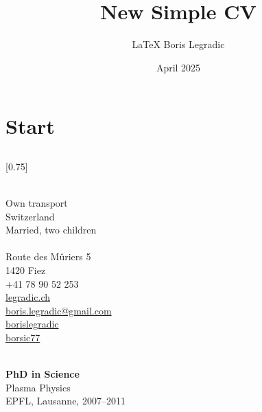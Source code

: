\documentclass[verylight]{simplehipstercv}
\title{New Simple CV}
\author{\LaTeX{} Boris Legradic}
\date{April 2025}
\begin{document}
\thispagestyle{empty}

\section*{Start}

\subsection*{}
\vspace{4em}

\setlength{\columnsep}{1.5cm}
[0.75]
\begin{paracol}{2}
\paracolbackgroundoptions

\footnotesize
{\setasidefontcolour
\flushright

\bigskip \bigskip
\begin{center}
\end{center}
\bigskip \bigskip

\\[0.5em]
Own transport\\
Switzerland\\
Married, two children\\

\bigskip \bigskip
{}\\[0.5em]
Route des Mûriers 5\\
1420 Fiez\\
+41 78 90 52 253\\

\bigskip
\href{https://legradic.ch}{legradic.ch }\\
\href{mailto:boris.legradic@gmail.com}{boris.legradic@gmail.com }\\
\href{https://www.linkedin.com/in/borislegradic}{borislegradic }\\
\href{https://github.com/borsic77}{borsic77 }

\bigskip \bigskip
{}\\[0.5em]

\textbf{PhD in Science}\\
Plasma Physics\\
EPFL, Lausanne, 2007–2011\\[0.5em]

}
\end{paracol}
\end{document}
